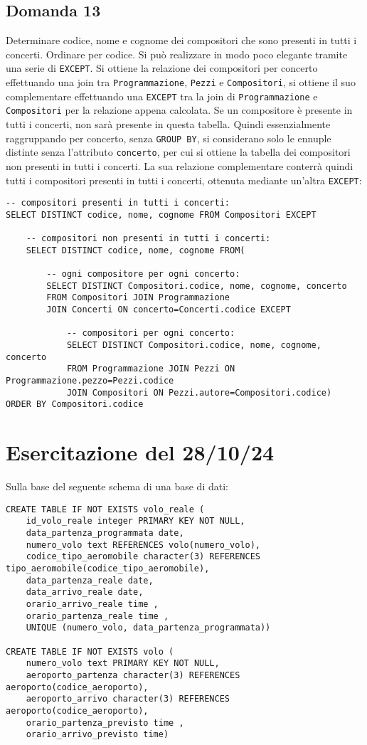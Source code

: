 \documentclass{article}
\numberwithin{equation}{subsection}
\begin{document}
\subsection*{Domanda 13}
Determinare codice, nome e cognome dei compositori che sono presenti in tutti i concerti. Ordinare per codice. Si può realizzare in modo poco elegante tramite una serie di \verb|EXCEPT|. Si ottiene la 
relazione dei compositori per concerto effettuando una join tra \verb|Programmazione|, \verb|Pezzi| e \verb|Compositori|, si ottiene il suo complementare effettuando una \verb|EXCEPT| tra la join di \verb|Programmazione| e 
\verb|Compositori| per la relazione appena calcolata. Se un compositore è presente in tutti i concerti, non sarà presente in questa tabella. Quindi essenzialmente raggruppando per concerto, senza \verb|GROUP BY|, si 
considerano solo le ennuple distinte senza l'attributo \verb|concerto|, per cui si ottiene la tabella dei compositori non presenti in tutti i concerti. La sua relazione complementare conterrà quindi tutti i compositori 
presenti in tutti i concerti, ottenuta mediante un'altra \verb|EXCEPT|:
\begin{verbatim}
-- compositori presenti in tutti i concerti:
SELECT DISTINCT codice, nome, cognome FROM Compositori EXCEPT
    
    -- compositori non presenti in tutti i concerti:
    SELECT DISTINCT codice, nome, cognome FROM(

        -- ogni compositore per ogni concerto:
        SELECT DISTINCT Compositori.codice, nome, cognome, concerto
        FROM Compositori JOIN Programmazione 
        JOIN Concerti ON concerto=Concerti.codice EXCEPT

            -- compositori per ogni concerto:
            SELECT DISTINCT Compositori.codice, nome, cognome, concerto
            FROM Programmazione JOIN Pezzi ON Programmazione.pezzo=Pezzi.codice
            JOIN Compositori ON Pezzi.autore=Compositori.codice)
ORDER BY Compositori.codice
\end{verbatim}

\clearpage

\section{Esercitazione del 28/10/24}

Sulla base del seguente schema di una base di dati:
\begin{verbatim}
CREATE TABLE IF NOT EXISTS volo_reale (
    id_volo_reale integer PRIMARY KEY NOT NULL,
    data_partenza_programmata date,
    numero_volo text REFERENCES volo(numero_volo),
    codice_tipo_aeromobile character(3) REFERENCES tipo_aeromobile(codice_tipo_aeromobile),
    data_partenza_reale date,
    data_arrivo_reale date,
    orario_arrivo_reale time ,
    orario_partenza_reale time ,
    UNIQUE (numero_volo, data_partenza_programmata))

CREATE TABLE IF NOT EXISTS volo (
    numero_volo text PRIMARY KEY NOT NULL,
    aeroporto_partenza character(3) REFERENCES aeroporto(codice_aeroporto),
    aeroporto_arrivo character(3) REFERENCES aeroporto(codice_aeroporto),
    orario_partenza_previsto time ,
    orario_arrivo_previsto time)
\end{verbatim}
\end{document}
